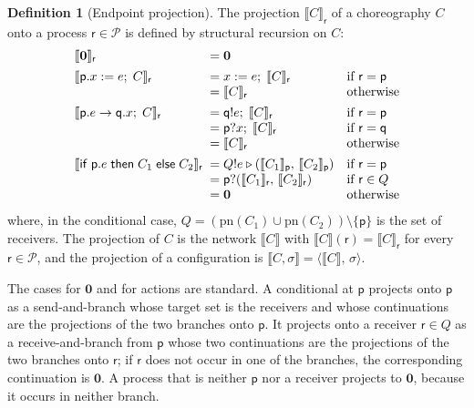 \documentclass[11pt]{article}
\theoremstyle{plain}
\theoremstyle{definition}
\newtheorem{definition}[theorem]{Definition}
\theoremstyle{remark}
\newcommand{\kw}[1]{\mathsf{#1}}
\newcommand{\kif}{\kw{if}\;}
\newcommand{\kthen}{\;\kw{then}\;}
\newcommand{\kelse}{\;\kw{else}\;}
\newcommand{\nil}{\mathbf{0}}
\newcommand{\seq}{;\;}
\newcommand{\pp}{\mathsf{p}}
\newcommand{\qq}{\mathsf{q}}
\newcommand{\rr}{\mathsf{r}}
\newcommand{\Procs}{\mathcal{P}}
\newcommand{\pn}{\mathrm{pn}}
\newcommand{\conf}[2]{\langle #1,\, #2\rangle}
\newcommand{\proj}[2]{\llbracket #1 \rrbracket_{#2}}
\newcommand{\projn}[1]{\llbracket #1 \rrbracket}
\newcommand{\ifcond}[3]{\kif #1 \kthen #2 \kelse #3}
\newcommand{\sendbr}[4]{#1!#2 \mathbin{\triangleright} (#3,\, #4)}
\newcommand{\recvbr}[3]{#1?(#2,\, #3)}
\begin{document}
\begin{definition}[Endpoint projection]\label{def:epp}
  The projection $\proj{C}{\rr}$ of a choreography $C$ onto a process
  $\rr\in\Procs$ is defined by structural recursion on $C$:
  \[
  \begin{array}{l@{\;\;}l@{\quad}l}
    \proj{\nil}{\rr} & = \nil \\[1ex]
    \proj{\pp.x := e \seq C}{\rr} & = x := e \seq \proj{C}{\rr} & \text{if } \rr = \pp\\
                                  & = \proj{C}{\rr} & \text{otherwise}\\[1ex]
    \proj{\pp.e \to \qq.x \seq C}{\rr} & = \qq!e \seq \proj{C}{\rr} & \text{if } \rr = \pp\\
                                       & = \pp?x \seq \proj{C}{\rr} & \text{if } \rr = \qq\\
                                       & = \proj{C}{\rr} & \text{otherwise}\\[1ex]
    \proj{\ifcond{\pp.e}{C_1}{C_2}}{\rr} & = \sendbr{Q}{e}{\proj{C_1}{\pp}}{\proj{C_2}{\pp}} & \text{if } \rr = \pp\\
                                         & = \recvbr{\pp}{\proj{C_1}{\rr}}{\proj{C_2}{\rr}} & \text{if } \rr \in Q\\
                                         & = \nil & \text{otherwise}
  \end{array}
  \]
  where, in the conditional case, $Q = (\pn(C_1)\cup\pn(C_2))\setminus\{\pp\}$
  is the set of receivers.  The projection of $C$ is the network
  $\projn{C}$ with $\projn{C}(\rr) = \proj{C}{\rr}$ for every $\rr\in\Procs$,
  and the projection of a configuration is
  $\projn{C,\sigma} = \conf{\projn{C}}{\sigma}$.
\end{definition}

The cases for $\nil$ and for actions are standard.  A conditional at $\pp$
projects onto $\pp$ as a send-and-branch whose target set is the receivers and
whose continuations are the projections of the two branches onto $\pp$.  It
projects onto a receiver $\rr\in Q$ as a receive-and-branch from $\pp$ whose
two continuations are the projections of the two branches onto $\rr$; if $\rr$
does not occur in one of the branches, the corresponding continuation is
$\nil$.  A process that is neither $\pp$ nor a receiver projects to $\nil$,
because it occurs in neither branch.
\end{document}
